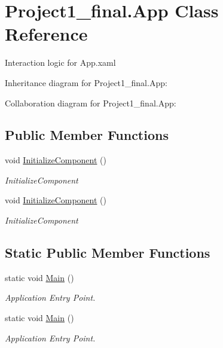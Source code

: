 \hypertarget{class_project1__final_1_1_app}{\section{Project1\+\_\+final.\+App Class Reference}
\label{class_project1__final_1_1_app}
}


Interaction logic for App.\+xaml  




Inheritance diagram for Project1\+\_\+final.\+App\+:


Collaboration diagram for Project1\+\_\+final.\+App\+:
\subsection*{Public Member Functions}
\begin{DoxyCompactItemize}
\item 
void \hyperlink{class_project1__final_1_1_app_a1c68688f55c56ad529a56ed5a3e1fcd2}{Initialize\+Component} ()
\begin{DoxyCompactList}\small\item\em Initialize\+Component \end{DoxyCompactList}\item 
void \hyperlink{class_project1__final_1_1_app_a1c68688f55c56ad529a56ed5a3e1fcd2}{Initialize\+Component} ()
\begin{DoxyCompactList}\small\item\em Initialize\+Component \end{DoxyCompactList}\end{DoxyCompactItemize}
\subsection*{Static Public Member Functions}
\begin{DoxyCompactItemize}
\item 
static void \hyperlink{class_project1__final_1_1_app_ad1caf21605429ec258b5a63b136173d3}{Main} ()
\begin{DoxyCompactList}\small\item\em Application Entry Point. \end{DoxyCompactList}\item 
static void \hyperlink{class_project1__final_1_1_app_ad1caf21605429ec258b5a63b136173d3}{Main} ()
\begin{DoxyCompactList}\small\item\em Application Entry Point. \end{DoxyCompactList}\end{DoxyCompactItemize}


